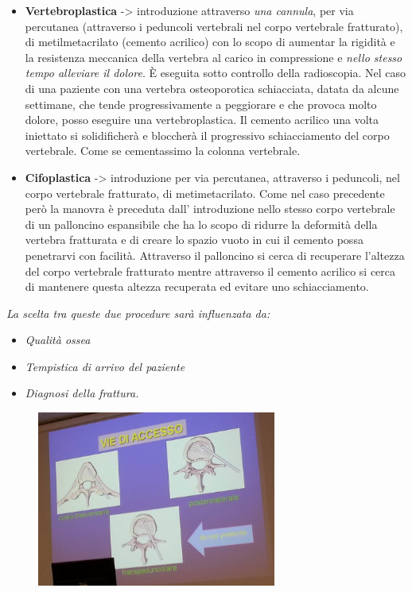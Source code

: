 \begin{itemize}

\item
  \textbf{Vertebroplastica} -> introduzione attraverso \emph{una cannula}, per via percutanea (attraverso i peduncoli vertebrali nel corpo vertebrale fratturato), di metilmetacrilato (cemento acrilico) con lo scopo di aumentar la rigidità e la resistenza meccanica della vertebra al carico in compressione e \emph{nello stesso tempo alleviare il dolore}. È eseguita sotto controllo della radioscopia. Nel caso di una paziente con una vertebra osteoporotica schiacciata, datata da alcune settimane, che tende progressivamente a peggiorare e che provoca molto dolore, posso eseguire una vertebroplastica. Il cemento acrilico una volta iniettato si solidificherà e bloccherà il progressivo schiacciamento del corpo vertebrale. Come se cementassimo la colonna vertebrale.

\item
  \textbf{Cifoplastica} -> introduzione per via percutanea, attraverso i peduncoli, nel corpo vertebrale fratturato, di metimetacrilato. Come nel caso precedente però la manovra è preceduta dall' introduzione nello stesso corpo vertebrale di un palloncino espansibile che ha lo scopo di ridurre la deformità della vertebra fratturata e di creare lo spazio vuoto in cui il cemento possa penetrarvi con facilità. Attraverso il palloncino si cerca di recuperare l'altezza del corpo vertebrale fratturato mentre attraverso il cemento acrilico si cerca di mantenere questa altezza recuperata ed evitare uno schiacciamento.
\end{itemize}

\emph{La scelta tra queste due procedure sarà influenzata da:}

\begin{itemize}
\item
  \emph{Qualità ossea }
\item
  \emph{Tempistica di arrivo del paziente }
\item
  \emph{Diagnosi della frattura.}
\end{itemize}

\begin{figure}[!ht]
\centering
\includegraphics[width=0.7\textwidth]{003/image5.jpeg}
\end{figure}

